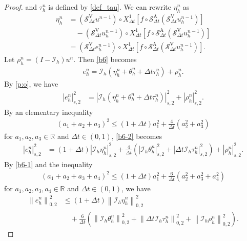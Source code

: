 \documentclass[10pt,a4paper]{amsart}
\def\norm#1#2{\left\|#2\right\|_{#1}}
\def\snorm#1#2{\left|#2\right|_{#1}}
\begin{document}
\begin{proof}
  and $ \tau_h^n $ is defined by \eqref{def_tau}. We can rewrite $ \eta_h^n $ as 
  \begin{align}
    \eta_h^n & = (\mathcal{S}_{\Delta t}^{\mathrm{V}} u^{n - 1}) \circ {X_{\Delta t}^1} [f \circ \mathcal{S}_{\Delta t}^{\mathrm{A}} (\mathcal{S}_{\Delta t}^{\mathrm{V}} u_h^{n - 1})] \\ & \quad - (\mathcal{S}_{\Delta t}^{\mathrm{V}} u_h^{n - 1}) \circ {X_{\Delta t}^1} [f \circ \mathcal{S}_{\Delta t}^{\mathrm{A}} (\mathcal{S}_{\Delta t}^{\mathrm{V}} u_h^{n - 1})] \\
    & = (\mathcal{S}_{\Delta t}^{\mathrm{V}} e_h^{n - 1}) \circ {X_{\Delta t}^1} [f \circ \mathcal{S}_{\Delta t}^{\mathrm{A}} (\mathcal{S}_{\Delta t}^{\mathrm{V}} u_h^{n - 1})]. \label{b9-2} 
  \end{align}
  Let $ \rho_h^n = (I - \mathcal{I}_{h}) u^n $. Then \eqref{b6} becomes 
  \begin{align}
    e_h^n = \mathcal{I}_{h} (\eta_h^n + \theta_h^n + \Delta t \tau_h^n) + \rho_h^n. \label{b6-1}
  \end{align}
  By \eqref{p:o}, we have 
  \begin{align}
    \snorm{s, 2}{e_h^n}^2 & = \snorm{s, 2}{\mathcal{I}_{h} (\eta_h^n + \theta_h^n + \Delta t \tau_h^n)}^2 + \snorm{s, 2}{\rho_h^n}^2. \label{b6-2} 
  \end{align}
  By an elementary inequality
  \begin{align} 
    (a_1 + a_2 + a_3)^2 \leq (1 + \Delta t) a_1^2 + \frac{4}{\Delta t} (a_2^2 + a_3^2) 
  \end{align} 
   for $ a_1, a_2, a_3 \in \mathbb{R} $ and $ \Delta t \in (0, 1) $, \eqref{b6-2} becomes 
  \begin{align} 
    \snorm{s, 2}{e_h^n}^2 & = \left(1 + \Delta t \right) \snorm{s, 2}{\mathcal{I}_{h} \eta_h^n}^2 + \frac{4}{\Delta t} \left(\snorm{s, 2}{\mathcal{I}_{h} \theta_h^n}^2 + \snorm{s, 2}{\Delta t \mathcal{I}_{h} \tau_h^n}^2\right) + \snorm{s, 2}{\rho_h^n}^2. \label{b12-1}
  \end{align} 
  By \eqref{b6-1} and the inequality 
  \begin{align}
    (a_1 + a_2 + a_3 + a_4)^2 \leq (1 + \Delta t) a_1^2 + \frac{6}{\Delta t} (a_2^2 + a_3^2 + a_4^2) 
  \end{align} 
  for $ a_1, a_2, a_3, a_4 \in \mathbb{R} $ and $ \Delta t \in (0, 1) $, we have 
  \begin{align} 
    \norm{0, 2}{e_h^n}^2 & \leq (1 + \Delta t) \norm{0, 2}{\mathcal{I}_{h} \eta_h^n}^2 \\ & \quad + \frac{6}{\Delta t} \left(\norm{0, 2}{\mathcal{I}_{h} \theta_h^n}^2 + \norm{0, 2}{\Delta t \mathcal{I}_{h} \tau_h^n}^2 + \norm{0, 2}{\mathcal{I}_{h} \rho_h^n}^2\right). \label{b12-2} 

\end{align}
\end{proof}
\end{document}
